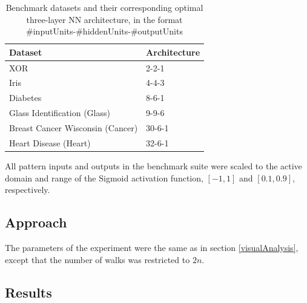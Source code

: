 \documentclass[conference]{IEEEtran}
\begin{document}
\begin{table}[!t] 
	\renewcommand{\arraystretch}{1.3}
	\caption{Benchmark datasets and their corresponding optimal three-layer NN architecture, in the format \#inputUnits-\#hiddenUnits-\#outputUnits}
	\label{tblNNBenchmarks}
	\centering
	\begin{tabular}{|l|l|}
		\hline
		\textbf{Dataset}		& \textbf{Architecture} \\ \hline				
		XOR									&  2-2-1		\\
		Iris								&  4-4-3 \cite{gupta1998weight}		\\
		Diabetes							&  8-6-1 \cite{carvalho2006particle}			\\
		Glass Identification (Glass)		&  9-9-6 \cite{gupta1998weight}			\\
		Breast Cancer Wisconsin (Cancer)	&  30-6-1 \cite{carvalho2006particle}		\\
		Heart Disease (Heart)				&  32-6-1 \cite{carvalho2006particle}	\\ \hline		
	\end{tabular}
\end{table}

All pattern inputs and outputs in the benchmark suite were scaled to the active domain and range of the Sigmoid activation function, $[-1,1]$ and $[0.1,0.9]$, respectively.
	
\subsection{Approach}
\label{nnApproach}
The parameters of the experiment were the same as in section \ref{visualAnalysis}, except that the number of walks was restricted to $2n$.

\subsection{Results}
\label{nnResults}
\end{document}
